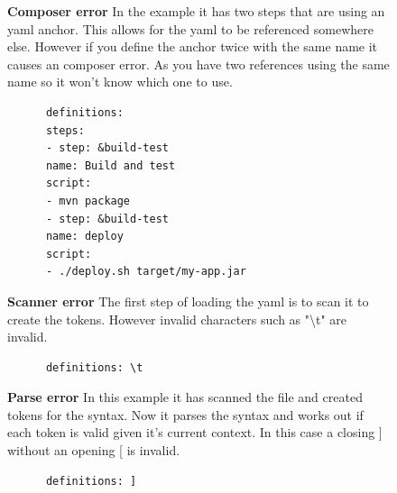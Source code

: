 \documentclass[twoside,12pt,titlepage,a4paper]{article}
\begin{document}
\begin{figure}[!ht]
  \centering
  \begin{minipage}[t]{.48\textwidth}
    \textbf{Composer error}
    In the example it has two steps that are using an yaml anchor. This allows for the yaml to be referenced somewhere else. However if you define the anchor twice with the same name it causes an composer error. As you have two references using the same name so it won't know which one to use.
  \end{minipage}%
  \hfill
  \begin{minipage}[t]{.48\textwidth}
    \begin{verbatim}
      definitions: 
      steps:
      - step: &build-test
      name: Build and test
      script:
      - mvn package
      - step: &build-test
      name: deploy
      script:
      - ./deploy.sh target/my-app.jar
    \end{verbatim}
  \end{minipage}
\end{figure}

\begin{figure}[!h]
  \centering
  \begin{minipage}[t]{.48\textwidth}
    \textbf{Scanner error}
    The first step of loading the yaml is to scan it to create the tokens. However invalid characters such as "\textbackslash t" are invalid. 
  \end{minipage}%
  \hfill
  \begin{minipage}[t]{.48\textwidth}
    \begin{verbatim}
      definitions: \t
    \end{verbatim}
  \end{minipage}
\end{figure}
\begin{figure}[!ht]
  \centering
  \begin{minipage}[t]{.48\textwidth}
    \textbf{Parse error}
    In this example it has scanned the file and created tokens for the syntax. Now it parses the syntax and works out if each token is valid given it's current context. In this case a closing ] without an opening [ is invalid.
  \end{minipage}%
  \hfill
  \begin{minipage}[t]{.48\textwidth}
    \begin{verbatim}
      definitions: ]
    \end{verbatim}
  \end{minipage}
\end{figure}
\end{document}
